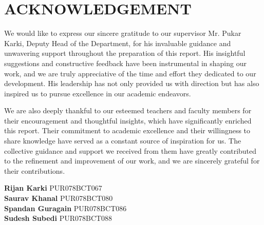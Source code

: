\chapter*{ACKNOWLEDGEMENT}

We would like to express our sincere gratitude to our supervisor Mr. Pukar Karki, Deputy Head of the Department, for his invaluable guidance and unwavering support throughout the preparation of this report. His insightful suggestions and constructive feedback have been instrumental in shaping our work, and we are truly appreciative of the time and effort they dedicated to our development. His leadership has not only provided us with direction but has also inspired us to pursue excellence in our academic endeavors.

We are also deeply thankful to our esteemed teachers and faculty members for their encouragement and thoughtful insights, which have significantly enriched this report. Their commitment to academic excellence and their willingness to share knowledge have served as a constant source of inspiration for us. The collective guidance and support we received from them have greatly contributed to the refinement and improvement of our work, and we are sincerely grateful for their contributions.

\vspace{1cm}
\textbf{Rijan Karki} 
PUR078BCT067\\
\textbf{Saurav Khanal} 
PUR078BCT080\\
\textbf{Spandan Guragain} 
PUR078BCT086\\
\textbf{Sudesh Subedi} 
PUR078BCT088\\
